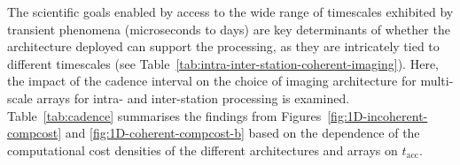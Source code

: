 \documentclass[
  journal=pasa,
  manuscript=article-type,
  year=2020,
  volume=37,
]{cup-journal}
\begin{document}
The scientific goals enabled by access to the wide range of timescales exhibited by transient phenomena (microseconds to days) are key determinants of whether the architecture deployed can support the processing, as they are intricately tied to different timescales (see Table~\ref{tab:intra-inter-station-coherent-imaging}). Here, the impact of the cadence interval on the choice of imaging architecture for multi-scale arrays for intra- and inter-station processing is examined. Table~\ref{tab:cadence} summarises the findings from Figures~\ref{fig:1D-incoherent-compcost} and \ref{fig:1D-coherent-compcost-b} based on the dependence of the computational cost densities of the different architectures and arrays on $t_\textrm{acc}$.


\end{document}
